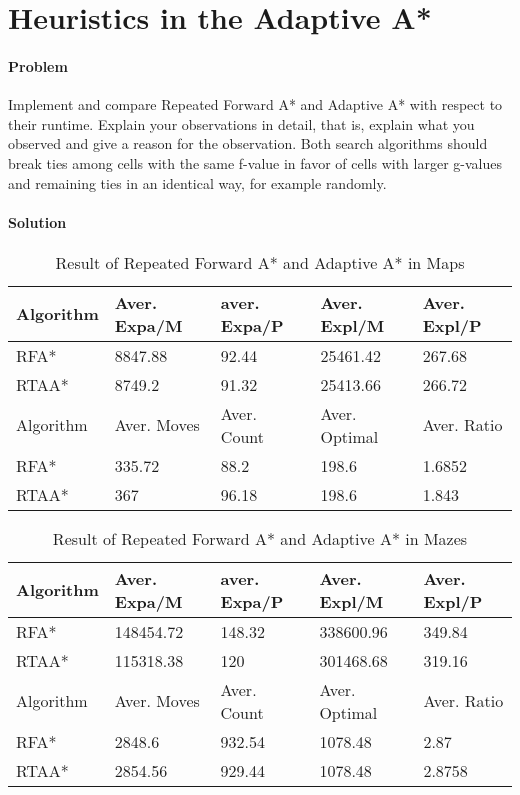 \section{Heuristics in the Adaptive A*}

\paragraph{Problem}
Implement and compare Repeated Forward A* and Adaptive A* with respect to their
runtime. Explain your observations in detail, that is, explain what you
observed and give a reason for the observation. Both search algorithms should
break ties among cells with the same f-value in favor of cells with larger
g-values and remaining ties in an identical way, for example randomly.

\paragraph{Solution}

\begin{table}[h!]
\centering
\caption{Result of Repeated Forward A* and Adaptive A* in Maps}
\begin{tabular}{|l|l|l|l|l|}
\hline
Algorithm & Aver. Expa/M & aver. Expa/P & Aver. Expl/M & Aver. Expl/P \\
\hline
RFA* & 8847.88 & 92.44 & 25461.42 & 267.68 \\
\hline
RTAA* & 8749.2 & 91.32 & 25413.66 & 266.72 \\
\hhline{|=|=|=|=|=|}
Algorithm & Aver. Moves & Aver. Count & Aver. Optimal & Aver. Ratio \\
\hline
RFA* & 335.72 & 88.2 & 198.6 & 1.6852 \\
\hline
RTAA* & 367 & 96.18 & 198.6 & 1.843 \\
\hline
\end{tabular}
\label{tbl:rpa-rtaa}
\end{table}

\begin{table}[h!]
\centering
\caption{Result of Repeated Forward A* and Adaptive A* in Mazes}
\begin{tabular}{|l|l|l|l|l|}
\hline
Algorithm & Aver. Expa/M & aver. Expa/P & Aver. Expl/M & Aver. Expl/P \\
\hline
RFA* & 148454.72 & 148.32 & 338600.96 & 349.84 \\
\hline
RTAA* & 115318.38 & 120 & 301468.68 & 319.16 \\
\hhline{|=|=|=|=|=|}
Algorithm & Aver. Moves & Aver. Count & Aver. Optimal & Aver. Ratio \\
\hline
RFA* & 2848.6 & 932.54 & 1078.48 & 2.87 \\
\hline
RTAA* & 2854.56 & 929.44 & 1078.48 & 2.8758 \\
\hline
\end{tabular}
\label{tbl:rpa-rtaa}
\end{table}

